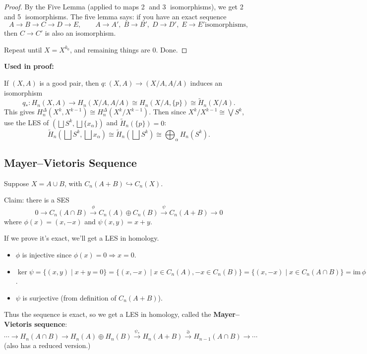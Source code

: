 \documentclass[12pt]{amsart}
\begin{document}
\begin{proof}
By the Five Lemma (applied to maps \textcircled{2} and \textcircled{3} isomorphisms), we get \textcircled{2} and \textcircled{5} isomorphisms. The five lemma says: if you have an exact sequence
\[
    A \to B \to C \to D \to E, \qquad A\to A',\; B\to B',\; D\to D',\; E\to E' \text{isomorphisms},
\]
then $C \to C'$ is also an isomorphism.

Repeat until $X = X^{k_0}$, and remaining things are $0$. Done.
\end{proof}

\textbf{Used in proof:}
\begin{theorem}
If $(X,A)$ is a good pair, then $q: (X,A) \to (X/A, A/A)$ induces an isomorphism
\[
    q_*: H_n(X,A) \to H_n(X/A, A/A) \cong H_n(X/A, \{p\}) \cong \widetilde{H}_n(X/A).
\]
This gives $H_n^\Delta(X^k, X^{k-1}) \cong H_n^\Delta(X^k/X^{k-1})$. Then since $X^k/X^{k-1} \cong \bigvee S^k$, use the LES of $(\bigsqcup S^k, \bigsqcup\{x_\alpha\})$ and $\widetilde{H}_n(\{p\}) = 0$:
\[
    \widetilde{H}_n\!\left(\bigsqcup S^k, \bigsqcup x_\alpha\right) \cong \widetilde{H}_n\!\left(\bigsqcup S^k\right) \cong \bigoplus_\alpha H_n(S^k).
\]
\end{theorem}

\subsection*{Mayer--Vietoris Sequence}

Suppose $X = A \cup B$, with $C_n(A+B) \hookrightarrow C_n(X)$.

Claim: there is a SES
\[
    0 \to C_n(A \cap B) \xrightarrow{\phi} C_n(A) \oplus C_n(B) \xrightarrow{\psi} C_n(A+B) \to 0
\]
where $\phi(x) = (x, -x)$ and $\psi(x,y) = x+y$.

If we prove it's exact, we'll get a LES in homology.
\begin{itemize}
    \item $\phi$ is injective since $\phi(x) = 0 \Rightarrow x = 0$.
    \item $\ker\psi = \{(x,y) \mid x+y=0\} = \{(x,-x) \mid x \in C_n(A), -x \in C_n(B)\} = \{(x,-x) \mid x \in C_n(A \cap B)\} = \mathrm{im}\,\phi$.
    \item $\psi$ is surjective (from definition of $C_n(A+B)$).
\end{itemize}

Thus the sequence is exact, so we get a LES in homology, called the \textbf{Mayer--Vietoris sequence}:
\[
    \cdots \to H_n(A \cap B) \to H_n(A) \oplus H_n(B) \xrightarrow{\psi_*} H_n(A+B) \xrightarrow{\partial} H_{n-1}(A \cap B) \to \cdots
\]
(also has a reduced version.)
\end{document}
